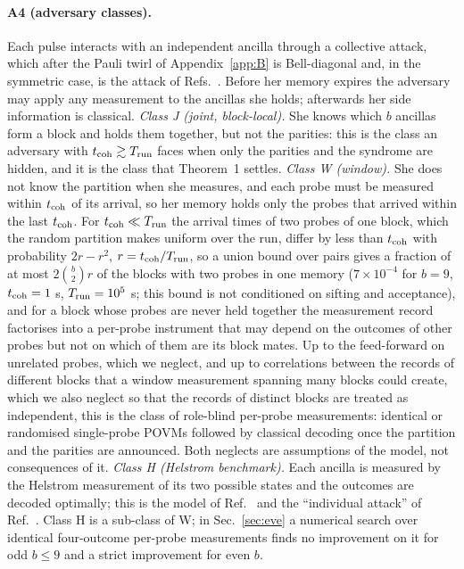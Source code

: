 \documentclass[aps,pra,twocolumn,superscriptaddress,nofootinbib]{revtex4-2}
\begin{document}
\paragraph*{A4 (adversary classes).} Each pulse interacts with an independent ancilla through a collective attack, which after the Pauli twirl of Appendix~\ref{app:B} is Bell-diagonal and, in the symmetric case, is the attack of Refs.~\cite{FGGNP97,GW99}. Before her memory expires the adversary may apply any measurement to the ancillas she holds; afterwards her side information is classical. \emph{Class J (joint, block-local).} She knows which $b$ ancillas form a block and holds them together, but not the parities: this is the class an adversary with $t_{\rm coh}\gtrsim T_{\rm run}$ faces when only the parities and the syndrome are hidden, and it is the class that Theorem~1 settles. \emph{Class W (window).} She does not know the partition when she measures, and each probe must be measured within $t_{\rm coh}$ of its arrival, so her memory holds only the probes that arrived within the last $t_{\rm coh}$. For $t_{\rm coh}\ll T_{\rm run}$ the arrival times of two probes of one block, which the random partition makes uniform over the run, differ by less than $t_{\rm coh}$ with probability $2r-r^2$, $r=t_{\rm coh}/T_{\rm run}$, so a union bound over pairs gives a fraction of at most $2\binom b2 r$ of the blocks with two probes in one memory ($7\times10^{-4}$ for $b=9$, $t_{\rm coh}=1$ s, $T_{\rm run}=10^5$ s; this bound is not conditioned on sifting and acceptance), and for a block whose probes are never held together the measurement record factorises into a per-probe instrument that may depend on the outcomes of other probes but not on which of them are its block mates. Up to the feed-forward on unrelated probes, which we neglect, and up to correlations between the records of different blocks that a window measurement spanning many blocks could create, which we also neglect so that the records of distinct blocks are treated as independent, this is the class of role-blind per-probe measurements: identical or randomised single-probe POVMs followed by classical decoding once the partition and the parities are announced. Both neglects are assumptions of the model, not consequences of it. \emph{Class H (Helstrom benchmark).} Each ancilla is measured by the Helstrom measurement of its two possible states and the outcomes are decoded optimally; this is the model of Ref.~\cite{GW99} and the ``individual attack'' of Ref.~\cite{BA07}. Class H is a sub-class of W; in Sec.~\ref{sec:eve} a numerical search over identical four-outcome per-probe measurements finds no improvement on it for odd $b\le9$ and a strict improvement for even $b$.
\end{document}
